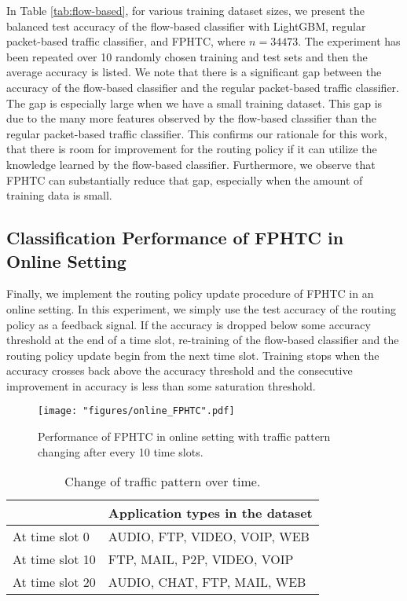 In Table \ref{tab:flow-based}, for various training dataset sizes, we present the balanced test accuracy of the flow-based classifier with LightGBM, regular packet-based traffic classifier, and FPHTC, where $n=34473$. The experiment has been repeated over 10 randomly chosen training and test sets and then the average accuracy is listed. We note that there is a significant gap between the accuracy of the flow-based classifier and the regular packet-based traffic classifier. The gap is especially large when we have a small training dataset. This gap is due to the many more features observed by the flow-based classifier than the regular packet-based traffic classifier. This confirms our rationale for this work, that there is room for improvement for the routing policy if it can utilize the knowledge learned by the flow-based classifier. Furthermore, we observe that FPHTC can substantially reduce that gap, especially when the amount of training data is small.


\subsection{Classification Performance of FPHTC in Online Setting}

Finally, we implement the routing policy update procedure of FPHTC in an online setting. In this experiment, we simply use the test accuracy of the routing policy as a feedback signal. If the accuracy is dropped below some accuracy threshold at the end of a time slot, re-training of the flow-based classifier and the routing policy update begin from the next time slot. Training stops when the accuracy crosses back above the accuracy threshold and the consecutive improvement in accuracy is less than some saturation threshold.


\begin{figure}[t]
	\centering
	\texttt{[image: "figures/online\_FPHTC".pdf]}
	\caption{Performance of FPHTC in online setting with traffic pattern changing after every 10 time slots.}
	\label{fig:online_FPHTC}
\end{figure}

\begin{table}[t]
	\centering
	\begin{tabular}{|P{0.27\textwidth}|P{0.35\textwidth}|}
		\hline
		& Application types in the dataset    \\ \hline
		At time slot 0 & AUDIO, FTP, VIDEO, VOIP, WEB          \\ \hline
		At time slot 10  & FTP, MAIL, P2P, VIDEO, VOIP      \\ \hline
		At time slot 20  & AUDIO, CHAT, FTP, MAIL, WEB\\ \hline
	\end{tabular}
	\caption{Change of traffic pattern over time.}
	\label{tab:pattern}
\end{table}

